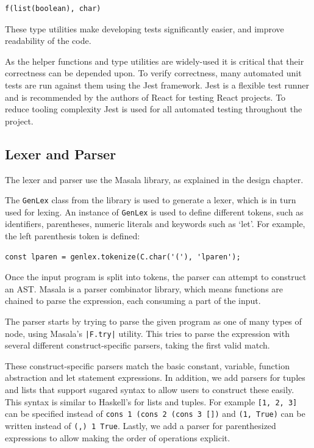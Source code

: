 \documentclass[a4paper,fleqn,oneside,12pt]{report}
\begin{document}
\begin{verbatim}
f(list(boolean), char)
\end{verbatim}
These type utilities make developing tests significantly easier, and improve readability of the code.

As the helper functions and type utilities are widely-used it is critical that their correctness can be depended upon. To verify correctness, many automated unit tests are run against them using the Jest framework. Jest is a flexible test runner and is recommended by the authors of React for testing React projects. To reduce tooling complexity Jest is used for all automated testing throughout the project.

\subsection{Lexer and Parser}\label{id:h.qbtwwllp8tw6}

The lexer and parser use the Masala library, as explained in the design chapter.

The \texttt{GenLex} class from the library is used to generate a lexer, which is in turn used for lexing. An instance of \texttt{GenLex} is used to define different tokens, such as identifiers, parentheses, numeric literals and keywords such as `let'. For example, the left parenthesis token is defined:

\begin{verbatim}
const lparen = genlex.tokenize(C.char('('), 'lparen');
\end{verbatim}
Once the input program is split into tokens, the parser can attempt to construct an AST. Masala is a parser combinator library, which means functions are chained to parse the expression, each consuming a part of the input.

The parser starts by trying to parse the given program as one of many types of node, using Masala’s \texttt{|F.try|} utility. This tries to parse the expression with several different construct-specific parsers, taking the first valid match.

These construct-specific parsers match the basic constant, variable, function abstraction and let statement expressions. In addition, we add parsers for tuples and lists that support sugared syntax to allow users to construct these easily. This syntax is similar to Haskell's for lists and tuples. For example \texttt{[1, 2, 3]} can be specified instead of \texttt{cons 1 (cons 2 (cons 3 [])} and \texttt{(1, True)} can be written instead of \texttt{(,) 1 True}. Lastly, we add a parser for parenthesized expressions to allow making the order of operations explicit.
\end{document}
